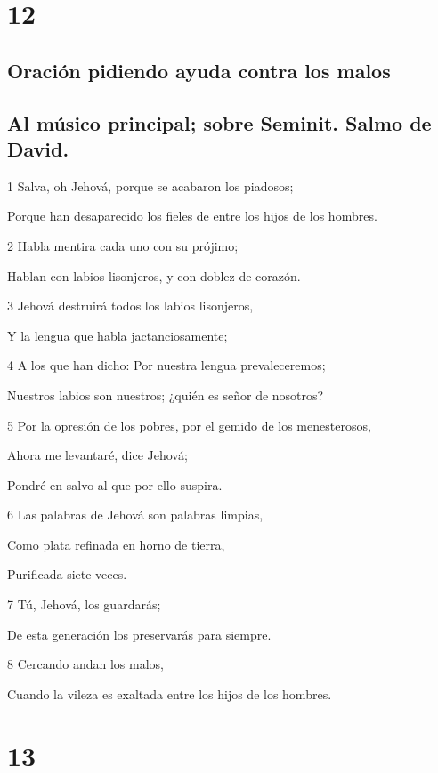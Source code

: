 \chapter{12}

\section*{Oración pidiendo ayuda contra los malos}

\section*{Al músico principal; sobre Seminit. Salmo de David.}

\par 1 Salva, oh Jehová, porque se acabaron los piadosos;
\par Porque han desaparecido los fieles de entre los hijos de los hombres.
\par 2 Habla mentira cada uno con su prójimo;
\par Hablan con labios lisonjeros, y con doblez de corazón.
\par 3 Jehová destruirá todos los labios lisonjeros,
\par Y la lengua que habla jactanciosamente;
\par 4 A los que han dicho: Por nuestra lengua prevaleceremos;
\par Nuestros labios son nuestros; ¿quién es señor de nosotros?
\par 5 Por la opresión de los pobres, por el gemido de los menesterosos,
\par Ahora me levantaré, dice Jehová;
\par Pondré en salvo al que por ello suspira.
\par 6 Las palabras de Jehová son palabras limpias,
\par Como plata refinada en horno de tierra,
\par Purificada siete veces.
\par 7 Tú, Jehová, los guardarás;
\par De esta generación los preservarás para siempre.
\par 8 Cercando andan los malos,
\par Cuando la vileza es exaltada entre los hijos de los hombres.

\chapter{13}

